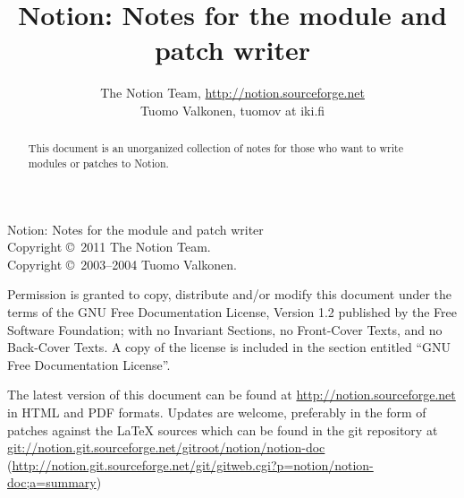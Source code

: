 \documentclass[english,a4paper,11pt,oldtoc,mctitle]{artikel3}
\title{Notion: Notes for the module and patch writer}
\author{The Notion Team, \url{http://notion.sourceforge.net} \\ 
	Tuomo Valkonen, tuomov at iki.fi}
\begin{document}
\maketitle

Notion: Notes for the module and patch writer\\
Copyright \copyright\  2011 The Notion Team.\\
Copyright \copyright\  2003--2004 Tuomo Valkonen.

Permission is granted to copy, distribute and/or modify this document
under the terms of the GNU Free Documentation License, Version 1.2
published by the Free Software Foundation;
with no Invariant Sections, no Front-Cover Texts, and no Back-Cover Texts.
A copy of the license is included in the section entitled ``GNU
Free Documentation License''.

The latest version of this document can be found at 
\url{http://notion.sourceforge.net} in HTML and PDF formats. Updates are
welcome, preferably in the form of patches against the \LaTeX{} sources which
can be found in the git repository at 
\url{git://notion.git.sourceforge.net/gitroot/notion/notion-doc} 
(\url{http://notion.git.sourceforge.net/git/gitweb.cgi?p=notion/notion-doc;a=summary})

\bigskip

\begin{abstract}
    This document is an unorganized collection of notes for
    those who want to write modules or patches to Notion.
\end{abstract}

\tableofcontents











\appendix





\printindex
\end{document}
